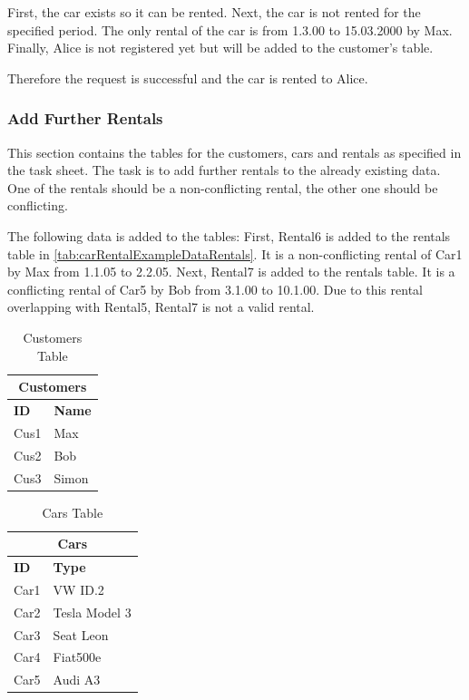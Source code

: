 First, the car exists so it can be rented.
Next, the car is not rented for the specified period.
The only rental of the car is from 1.3.00 to 15.03.2000 by Max.
Finally, Alice is not registered yet but will be added to the customer's table.

Therefore the request is successful and the car is rented to Alice.

\subsubsection*{Add Further Rentals}
This section contains the tables for the customers, cars and rentals as specified in the task sheet.
The task is to add further rentals to the already existing data.
One of the rentals should be a non-conflicting rental, the other one should be conflicting.

The following data is added to the tables:
First, Rental6 is added to the rentals table in \autoref{tab:carRentalExampleDataRentals}.
It is a non-conflicting rental of Car1 by Max from 1.1.05 to 2.2.05.
Next, Rental7 is added to the rentals table.
It is a conflicting rental of Car5 by Bob from 3.1.00 to 10.1.00.
Due to this rental overlapping with Rental5, Rental7 is not a valid rental.

\begin{table}[H]
    \centering
    \caption{Customers Table}
    \label{tab:carRentalExampleDataCustomers}
    \begin{tabular}{|p{2cm}|p{2cm}|}
        \hline
        \multicolumn{2}{|c|}{\textbf{Customers}} \\
        \hline
        \textbf{ID} & \textbf{Name} \\
        \hline
        Cus1 & Max \\
        Cus2 & Bob \\
        Cus3 & Simon \\
        \hline
    \end{tabular}
\end{table}

\begin{table}[H]
    \centering
    \caption{Cars Table}
    \label{tab:carRentalExampleDataCars}
    \begin{tabular}{|p{2cm}|p{3cm}|}
        \hline
        \multicolumn{2}{|c|}{\textbf{Cars}} \\
        \hline
        \textbf{ID} & \textbf{Type} \\
        \hline
        Car1 & VW ID.2 \\
        Car2 & Tesla Model 3 \\
        Car3 & Seat Leon \\
        Car4 & Fiat500e \\
        Car5 & Audi A3 \\
        \hline
    \end{tabular}
\end{table}

